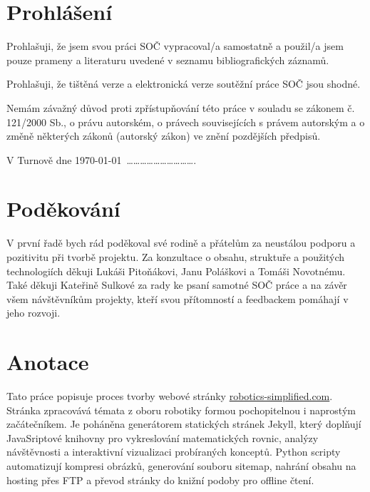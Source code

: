 \documentclass[a4paper, 12pt]{article}
\begin{document}
  \vspace{4em}

  \newpage

  \section*{\normalfont\textbf{Prohlášení}}
  Prohlašuji, že jsem svou práci SOČ vypracoval/a samostatně a použil/a jsem pouze prameny a literaturu uvedené v seznamu bibliografických záznamů.

  Prohlašuji, že tištěná verze a elektronická verze soutěžní práce SOČ jsou shodné.

  Nemám závažný důvod proti zpřístupňování této práce v souladu se zákonem č. 121/2000 Sb., o právu autorském, o právech souvisejících s právem autorským a o změně některých zákonů (autorský zákon) ve znění pozdějších předpisů.

  \qquad

  V Turnově dne \today \, ………………………….\\%

  \newpage

  \section*{\normalfont\textbf{Poděkování}}
  V první řadě bych rád poděkoval své rodině a přátelům za neustálou podporu a pozitivitu při tvorbě projektu. Za konzultace o obsahu, struktuře a použitých technologiích děkuji Lukáši Pitoňákovi, Janu Poláškovi a Tomáši Novotnému. Také děkuji Kateřině Sulkové za rady ke psaní samotné SOČ práce a na závěr všem návštěvníkům projekty, kteří svou přítomností a feedbackem pomáhají v jeho rozvoji.

  \newpage

  \section*{\normalfont\textbf{Anotace}}
  Tato práce popisuje proces tvorby webové stránky \url{robotics-simplified.com}. Stránka zpracovává témata z oboru robotiky formou pochopitelnou i naprostým začátečníkem. Je poháněna generátorem statických stránek Jekyll, který doplňují JavaSriptové knihovny pro vykreslování matematických rovnic, analýzy návštěvnosti a interaktivní vizualizaci probíraných konceptů. Python scripty automatizují kompresi obrázků, generování souboru sitemap, nahrání obsahu na hosting přes FTP a převod stránky do knižní podoby pro offline čtení.
\end{document}
